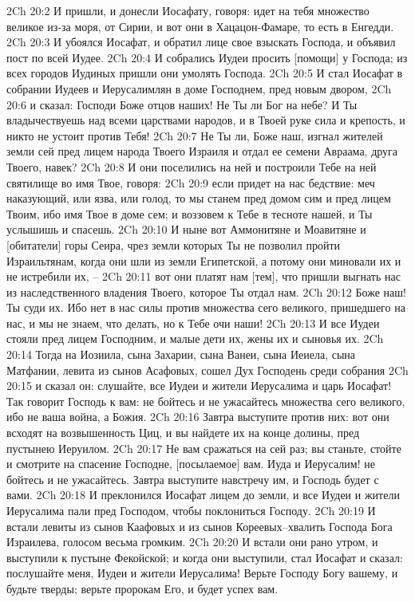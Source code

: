 2Ch 20:2  И пришли, и донесли Иосафату, говоря: идет на тебя множество великое из-за моря, от Сирии, и вот они в Хацацон-Фамаре, то есть в Енгедди.
2Ch 20:3  И убоялся Иосафат, и обратил лице свое взыскать Господа, и объявил пост по всей Иудее.
2Ch 20:4  И собрались Иудеи просить [помощи] у Господа; из всех городов Иудиных пришли они умолять Господа.
2Ch 20:5  И стал Иосафат в собрании Иудеев и Иерусалимлян в доме Господнем, пред новым двором,
2Ch 20:6  и сказал: Господи Боже отцов наших! Не Ты ли Бог на небе? И Ты владычествуешь над всеми царствами народов, и в Твоей руке сила и крепость, и никто не устоит против Тебя!
2Ch 20:7  Не Ты ли, Боже наш, изгнал жителей земли сей пред лицем народа Твоего Израиля и отдал ее семени Авраама, друга Твоего, навек?
2Ch 20:8  И они поселились на ней и построили Тебе на ней святилище во имя Твое, говоря:
2Ch 20:9  если придет на нас бедствие: меч наказующий, или язва, или голод, то мы станем пред домом сим и пред лицем Твоим, ибо имя Твое в доме сем; и воззовем к Тебе в тесноте нашей, и Ты услышишь и спасешь.
2Ch 20:10  И ныне вот Аммонитяне и Моавитяне и [обитатели] горы Сеира, чрез земли которых Ты не позволил пройти Израильтянам, когда они шли из земли Египетской, а потому они миновали их и не истребили их, --
2Ch 20:11  вот они платят нам [тем], что пришли выгнать нас из наследственного владения Твоего, которое Ты отдал нам.
2Ch 20:12  Боже наш! Ты суди их. Ибо нет в нас силы против множества сего великого, пришедшего на нас, и мы не знаем, что делать, но к Тебе очи наши!
2Ch 20:13  И все Иудеи стояли пред лицем Господним, и малые дети их, жены их и сыновья их.
2Ch 20:14  Тогда на Иозиила, сына Захарии, сына Ванеи, сына Иеиела, сына Матфании, левита из сынов Асафовых, сошел Дух Господень среди собрания
2Ch 20:15  и сказал он: слушайте, все Иудеи и жители Иерусалима и царь Иосафат! Так говорит Господь к вам: не бойтесь и не ужасайтесь множества сего великого, ибо не ваша война, а Божия.
2Ch 20:16  Завтра выступите против них: вот они всходят на возвышенность Циц, и вы найдете их на конце долины, пред пустынею Иеруилом.
2Ch 20:17  Не вам сражаться на сей раз; вы станьте, стойте и смотрите на спасение Господне, [посылаемое] вам. Иуда и Иерусалим! не бойтесь и не ужасайтесь. Завтра выступите навстречу им, и Господь будет с вами.
2Ch 20:18  И преклонился Иосафат лицем до земли, и все Иудеи и жители Иерусалима пали пред Господом, чтобы поклониться Господу.
2Ch 20:19  И встали левиты из сынов Каафовых и из сынов Кореевых--хвалить Господа Бога Израилева, голосом весьма громким.
2Ch 20:20  И встали они рано утром, и выступили к пустыне Фекойской; и когда они выступили, стал Иосафат и сказал: послушайте меня, Иудеи и жители Иерусалима! Верьте Господу Богу вашему, и будьте тверды; верьте пророкам Его, и будет успех вам.

